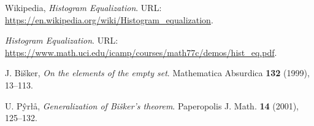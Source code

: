 \begin{thebibliography}{3}
Wikipedia,
\emph{Histogram Equalization}.
URL: \url{https://en.wikipedia.org/wiki/Histogram_equalization}.


\emph{Histogram Equalization}.
URL: \url{https://www.math.uci.edu/icamp/courses/math77c/demos/hist_eq.pdf}.






J. Bi\v{s}ker, \emph{On the elements
of the empty set}. Mathematica Absurdica
\textbf{132} (1999), 13--113.


U. P\^{y}r{\l}\aa, \emph{Generalization
of Bi\v{s}ker's theorem}. Paperopolis
J. Math. \textbf{14} (2001), 125--132.


\end{thebibliography}
\nonfrenchspacing
